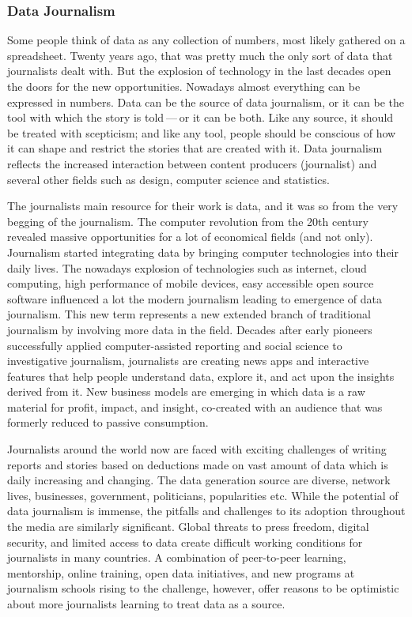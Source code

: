 \subsubsection{Data Journalism}
Some people think of data as any collection of numbers, most likely gathered on a spreadsheet. Twenty years ago, that was pretty much the only sort of data that journalists dealt with. But the explosion of technology in the last decades open the doors for the new opportunities. Nowadays almost everything can be expressed in numbers. Data can be the source of data journalism, or it can be the tool with which the story is told — or it can be both. Like any source, it should be treated with scepticism; and like any tool, people should be conscious of how it can shape and restrict the stories that are created with it. Data journalism reflects the increased interaction between content producers (journalist) and several other fields such as design, computer science and statistics.

The journalists main resource for their work is data, and it was so from the very begging of the journalism. The computer revolution from the 20th century revealed massive opportunities for a lot of economical fields (and not only). Journalism started integrating data by bringing computer technologies into their daily lives. The nowadays explosion of technologies such as internet, cloud computing, high performance of mobile devices, easy accessible open source software influenced a lot the modern journalism leading to emergence of data journalism. This new term represents a new extended branch of traditional journalism by involving more data in the field. Decades after early pioneers successfully applied computer-assisted reporting and social science to investigative journalism, journalists are creating news apps and interactive features that help people understand data, explore it, and act upon the insights derived from it. New business models are emerging in which data is a raw material for profit, impact, and insight, co-created with an audience that was formerly reduced to passive consumption.

Journalists around the world now are faced with exciting challenges of writing reports and stories based on deductions made on vast amount of data which is daily increasing and changing. The data generation source are diverse, network lives, businesses, government, politicians, popularities etc. While the potential of data journalism is immense, the pitfalls and challenges to its adoption throughout the media are similarly significant. Global threats to press freedom, digital security, and limited access to data create difficult working conditions for journalists in many countries. A combination of peer-to-peer learning, mentorship, online training, open data initiatives, and new programs at journalism schools rising to the challenge, however, offer reasons to be optimistic about more journalists learning to treat data as a source.

